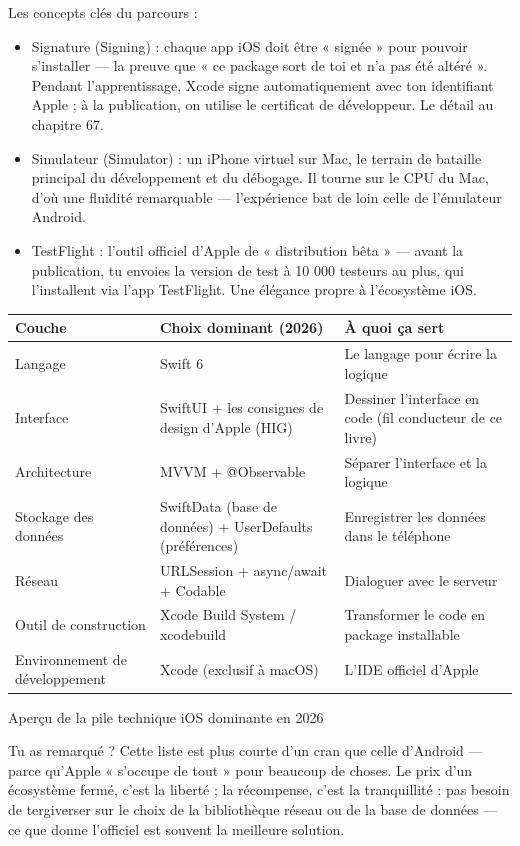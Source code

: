 Les concepts clés du parcours :

\begin{itemize}
  \item Signature (Signing) : chaque app iOS doit être « signée » pour pouvoir s’installer — la preuve que « ce package sort de toi et n’a pas été altéré ». Pendant l’apprentissage, Xcode signe automatiquement avec ton identifiant Apple ; à la publication, on utilise le certificat de développeur. Le détail au chapitre 67.
  \item Simulateur (Simulator) : un iPhone virtuel sur Mac, le terrain de bataille principal du développement et du débogage. Il tourne sur le CPU du Mac, d’où une fluidité remarquable — l’expérience bat de loin celle de l’émulateur Android.
  \item TestFlight : l’outil officiel d’Apple de « distribution bêta » — avant la publication, tu envoies la version de test à 10 000 testeurs au plus, qui l’installent via l’app TestFlight. Une élégance propre à l’écosystème iOS.
\end{itemize}


\begin{center}
\begin{tabularx}{\linewidth}{|X|X|X|}
\hline
\textbf{Couche} & \textbf{Choix dominant (2026)} & \textbf{À quoi ça sert} \tabularnewline
\hline
Langage & Swift 6 & Le langage pour écrire la logique \tabularnewline
Interface & SwiftUI + les consignes de design d’Apple (HIG) & Dessiner l’interface en code (fil conducteur de ce livre) \tabularnewline
Architecture & MVVM + @Observable & Séparer l’interface et la logique \tabularnewline
Stockage des données & SwiftData (base de données) + UserDefaults (préférences) & Enregistrer les données dans le téléphone \tabularnewline
Réseau & URLSession + async/await + Codable & Dialoguer avec le serveur \tabularnewline
Outil de construction & Xcode Build System / xcodebuild & Transformer le code en package installable \tabularnewline
Environnement de développement & Xcode (exclusif à macOS) & L’IDE officiel d’Apple \tabularnewline
\hline
\end{tabularx}
\end{center}

\begin{center}\small\color{gray}Aperçu de la pile technique iOS dominante en 2026\end{center}

Tu as remarqué ? Cette liste est plus courte d’un cran que celle d’Android — parce qu’Apple « s’occupe de tout » pour beaucoup de choses. Le prix d’un écosystème fermé, c’est la liberté ; la récompense, c’est la tranquillité : pas besoin de tergiverser sur le choix de la bibliothèque réseau ou de la base de données — ce que donne l’officiel est souvent la meilleure solution.

